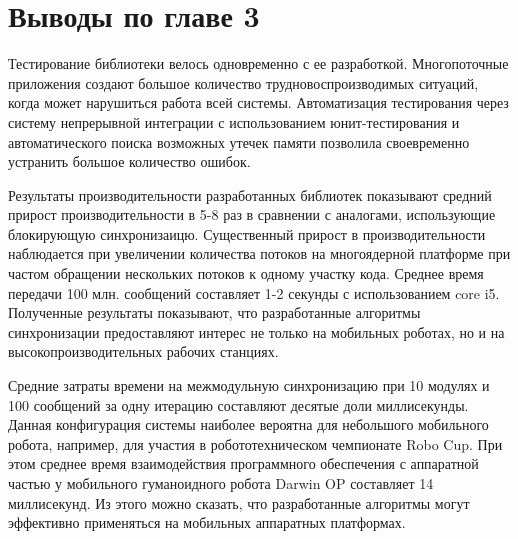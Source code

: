 \section*{Выводы по главе 3}

Тестирование библиотеки велось одновременно с ее разработкой. Многопоточные 
приложения создают большое количество трудновоспроизводимых ситуаций, когда 
может нарушиться работа всей системы. Автоматизация тестирования через систему 
непрерывной интеграции с использованием юнит-тестирования и автоматического 
поиска возможных утечек памяти позволила своевременно устранить большое 
количество ошибок.

Результаты производительности разработанных библиотек показывают средний прирост производительности в 5-8 раз в сравнении с аналогами, использующие блокирующую синхронизаицю. Существенный прирост в производительности наблюдается при увеличении количества потоков на многоядерной платформе при частом обращении нескольких потоков к одному участку кода. Среднее время передачи 100 млн. сообщений составляет 1-2 секунды с использованием core i5. Полученные результаты показывают, что разработанные алгоритмы синхронизации предоставляют интерес не только на мобильных роботах, но и на высокопроизводительных рабочих станциях.

Средние затраты времени на межмодульную синхронизацию при 10 модулях и 100 сообщений за одну итерацию составляют десятые доли миллисекунды. Данная конфигурация системы наиболее вероятна для небольшого мобильного робота, например, для участия в робототехническом чемпионате Robo Cup. При этом среднее время взаимодействия программного обеспечения с аппаратной частью у мобильного гуманоидного робота Darwin OP составляет 14 миллисекунд.  Из этого можно сказать, что разработанные алгоритмы могут эффективно применяться на мобильных аппаратных платформах.